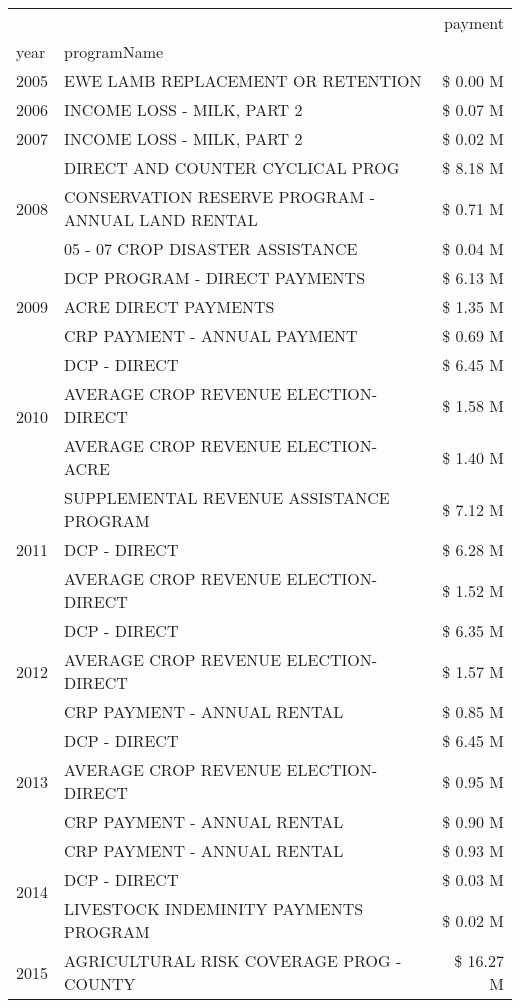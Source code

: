 \begin{tabular}{llr}
\toprule
 &  & payment \\
year & programName &  \\
\midrule
2005 & EWE LAMB REPLACEMENT OR RETENTION & \$ 0.00 M \\
\cline{1-3}
2006 & INCOME LOSS - MILK, PART 2 & \$ 0.07 M \\
\cline{1-3}
2007 & INCOME LOSS - MILK, PART 2 & \$ 0.02 M \\
\cline{1-3}
\multirow[t]{3}{*}{2008} & DIRECT AND COUNTER CYCLICAL PROG & \$ 8.18 M \\
 & CONSERVATION RESERVE PROGRAM - ANNUAL LAND RENTAL & \$ 0.71 M \\
 & 05 - 07 CROP DISASTER ASSISTANCE & \$ 0.04 M \\
\cline{1-3}
\multirow[t]{3}{*}{2009} & DCP PROGRAM - DIRECT PAYMENTS & \$ 6.13 M \\
 & ACRE DIRECT PAYMENTS & \$ 1.35 M \\
 & CRP PAYMENT - ANNUAL PAYMENT & \$ 0.69 M \\
\cline{1-3}
\multirow[t]{3}{*}{2010} & DCP - DIRECT & \$ 6.45 M \\
 & AVERAGE CROP REVENUE ELECTION-DIRECT & \$ 1.58 M \\
 & AVERAGE CROP REVENUE ELECTION-ACRE & \$ 1.40 M \\
\cline{1-3}
\multirow[t]{3}{*}{2011} & SUPPLEMENTAL REVENUE ASSISTANCE PROGRAM & \$ 7.12 M \\
 & DCP - DIRECT & \$ 6.28 M \\
 & AVERAGE CROP REVENUE ELECTION-DIRECT & \$ 1.52 M \\
\cline{1-3}
\multirow[t]{3}{*}{2012} & DCP - DIRECT & \$ 6.35 M \\
 & AVERAGE CROP REVENUE ELECTION-DIRECT & \$ 1.57 M \\
 & CRP PAYMENT - ANNUAL RENTAL & \$ 0.85 M \\
\cline{1-3}
\multirow[t]{3}{*}{2013} & DCP - DIRECT & \$ 6.45 M \\
 & AVERAGE CROP REVENUE ELECTION-DIRECT & \$ 0.95 M \\
 & CRP PAYMENT - ANNUAL RENTAL & \$ 0.90 M \\
\cline{1-3}
\multirow[t]{3}{*}{2014} & CRP PAYMENT - ANNUAL RENTAL & \$ 0.93 M \\
 & DCP - DIRECT & \$ 0.03 M \\
 & LIVESTOCK INDEMINITY PAYMENTS PROGRAM & \$ 0.02 M \\
\cline{1-3}
\multirow[t]{3}{*}{2015} & AGRICULTURAL RISK COVERAGE PROG - COUNTY & \$ 16.27 M \\

\end{tabular}
